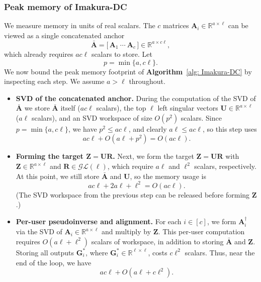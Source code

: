 \documentclass[final,3p,times]{elsarticle}
\theoremstyle{plain}
\newcommand{\matr}[1]{\bm{#1}}        %
\begin{document}
\subsubsection{Peak memory of Imakura-DC}
\label{subsubsec: Imakura memory}
We measure memory in units of real scalars. The $c$ matrices $\matr{A}_i \in \mathbb{R}^{a \times \ell}$ can be viewed as a single concatenated anchor
\begin{equation}
  \bar{\matr{A}}
  = \bigl[\,\matr{A}_1~\cdots~\matr{A}_c\,\bigr]
  \in \mathbb{R}^{a \times c\ell},
\end{equation}
which already requires $a c \ell$ scalars to store.  Let
\begin{equation}
  p = \min\{a, c\ell\}.
\end{equation}
We now bound the peak memory footprint of \textbf{Algorithm}~\ref{alg: Imakura-DC} by inspecting each step. We assume $a > \ell$ throughout.

\begin{itemize}
  \item \textbf{SVD of the concatenated anchor.}
        During the computation of the SVD of $\bar{\matr{A}}$ we store $\bar{\matr{A}}$ itself ($a c \ell$ scalars), the top $\ell$ left singular vectors $\matr{U} \in \mathbb{R}^{a \times \ell}$ ($a\ell$ scalars), and an SVD workspace of size $O(p^{2})$ scalars. Since $p = \min\{a, c\ell\}$, we have $p^{2} \le a c \ell$, and clearly $a\ell \le a c \ell$, so this step uses
        \begin{equation}
          a c \ell + O(a\ell + p^{2})
          = O(a c \ell).
        \end{equation}

  \item \textbf{Forming the target $\matr{Z} = \matr{U}\matr{R}$.} Next, we form the target
        $\matr{Z} = \matr{U}\matr{R}$ with
        $\matr{Z} \in \mathbb{R}^{a \times \ell}$ and
        $\matr{R} \in \mathcal{GL}(\ell)$, which require $a\ell$ and
        $\ell^{2}$ scalars, respectively.  At this point, we still store
        $\bar{\matr{A}}$ and $\matr{U}$, so the memory usage is
        \begin{equation}
          a c \ell + 2 a \ell + \ell^{2}
          = O(a c \ell).
        \end{equation}
        (The SVD workspace from the previous step can be released before
        forming $\matr{Z}$.)

  \item \textbf{Per-user pseudoinverse and alignment.}
        For each $i \in [c]$, we form $\matr{A}_i^\dagger$ via the SVD
        of $\matr{A}_i \in \mathbb{R}^{a \times \ell}$ and multiply by
        $\matr{Z}$.  This per-user computation requires
        $O(a\ell + \ell^{2})$ scalars of workspace, in
        addition to storing $\bar{\matr{A}}$ and $\matr{Z}$.  Storing
        all outputs $\matr{G}_i^*$, where
        $\matr{G}_i^* \in \mathbb{R}^{\ell \times \ell}$, costs
        $c \ell^{2}$ scalars.  Thus, near the end of the loop, we have
        \begin{equation}
          a c \ell
            + O(a\ell + c \ell^{2}).
        \end{equation}
\end{itemize}
\end{document}
